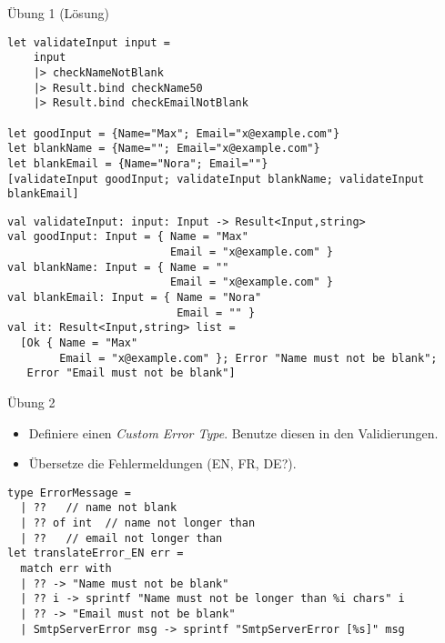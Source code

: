 \documentclass[t]{beamer}
\begin{document}
\begin{frame}[label={sec:orgd1da6cc},fragile]{Übung 1 (Lösung)}
 \begin{verbatim}
let validateInput input =
    input
    |> checkNameNotBlank
    |> Result.bind checkName50
    |> Result.bind checkEmailNotBlank

let goodInput = {Name="Max"; Email="x@example.com"}
let blankName = {Name=""; Email="x@example.com"}
let blankEmail = {Name="Nora"; Email=""}
[validateInput goodInput; validateInput blankName; validateInput blankEmail]
\end{verbatim}

\begin{verbatim}
val validateInput: input: Input -> Result<Input,string>
val goodInput: Input = { Name = "Max"
                         Email = "x@example.com" }
val blankName: Input = { Name = ""
                         Email = "x@example.com" }
val blankEmail: Input = { Name = "Nora"
                          Email = "" }
val it: Result<Input,string> list =
  [Ok { Name = "Max"
        Email = "x@example.com" }; Error "Name must not be blank";
   Error "Email must not be blank"]
\end{verbatim}
\end{frame}

\begin{frame}[label={sec:org550180a},fragile]{Übung 2}
 \begin{itemize}
\item Definiere einen \emph{Custom Error Type}. Benutze diesen in den Validierungen.
\item Übersetze die Fehlermeldungen (EN, FR, DE?).
\end{itemize}

\begin{verbatim}
type ErrorMessage =
  | ??   // name not blank
  | ?? of int  // name not longer than
  | ??   // email not longer than
let translateError_EN err =
  match err with
  | ?? -> "Name must not be blank"
  | ?? i -> sprintf "Name must not be longer than %i chars" i
  | ?? -> "Email must not be blank"
  | SmtpServerError msg -> sprintf "SmtpServerError [%s]" msg
\end{verbatim}
\end{frame}
\end{document}
